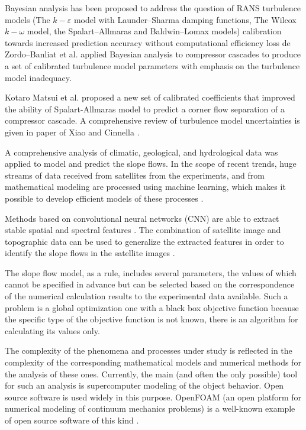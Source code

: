 \documentclass[applsci,article,submit,moreauthors,pdftex]{Definitions/mdpi}
\begin{document}
Bayesian analysis has been proposed to address the question of RANS turbulence models (The $k-\varepsilon$ model with Launder–Sharma damping functions, The Wilcox $k-\omega$ model, the Spalart–Allmaras and Baldwin–Lomax models) calibration towards increased prediction accuracy without computational efficiency loss \cite{Edeling2014a,Edeling2014b}  de Zordo–Banliat et al. \cite{deZordoBanliat2020}  applied Bayesian analysis to compressor cascades to produce a set of calibrated turbulence model parameters with emphasis on the turbulence model inadequacy.

Kotaro Matsui et al. \cite{Matsui2021} proposed a new set of calibrated coefficients that improved the ability of Spalart-Allmaras model to predict a corner flow separation of a compressor cascade. A comprehensive review of turbulence model uncertainties is given in paper of Xiao and Cinnella \cite{Xiao2019}. 


A comprehensive analysis of climatic, geological, and hydrological data was applied to model and predict the slope flows. In the scope of recent trends, huge streams of data received from satellites from the experiments, and from mathematical modeling are processed using machine learning, which makes it possible to develop efficient models of these processes \cite{GeoML, Ma2020}.

Methods based on convolutional neural networks (CNN) are able to extract stable spatial and spectral features \cite{Maggiori2017}. The combination of satellite image and topographic data can be used to generalize the extracted features in order to identify the slope flows in the satellite images \cite{Qin2021, Prakash2021}.

The slope flow model, as a rule, includes several parameters, the values of which cannot be specified in advance but can be selected based on the correspondence of the numerical calculation results to the experimental data available. Such a problem is a global optimization one with a black box objective function because the specific type of the objective function is not known, there is an algorithm for calculating its values only.

The complexity of the phenomena and processes under study is reflected in the complexity of the corresponding mathematical models and numerical methods for the analysis of these ones. Currently, the main (and often the only possible) tool for such an analysis is supercomputer modeling of the object behavior. Open source software is used widely in this purpose. OpenFOAM (an open platform for numerical modeling of continuum mechanics problems) is a well-known example of open source software of this kind \cite{Weller1998}. 
\end{document}
